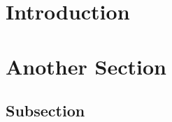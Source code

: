 \documentclass[]{auvsi_doc}
\begin{document}
\begin{AUVSITitlePage}
\end{AUVSITitlePage}

\section{Introduction}

\blindtext

\blindtext 

\blindtext 

\blindtext 

\blindtext

\blindtext

\section{Another Section}

\blindtext

\blindtext

\subsection{Subsection}

\blindtext

\blindtext 

\blindtext 

\blindtext 

\blindtext

\blindtext
\end{document}
